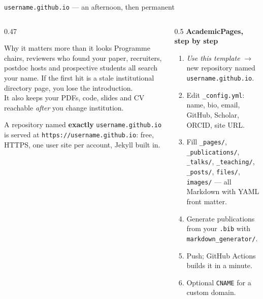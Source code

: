 \documentclass[aspectratio=169,11pt]{beamer}
\newcommand{\code}[1]{\texttt{\small #1}}
\newcommand{\key}[1]{\textbf{\color{brand}#1}}
\begin{document}
\begin{frame}{\code{username.github.io} --- an afternoon, then permanent}
\begin{columns}[T]
\begin{column}{0.47\textwidth}
\begin{block}{Why it matters more than it looks}
\footnotesize
Programme chairs, reviewers who found your paper, recruiters, postdoc hosts
and prospective students all search your name. If the first hit is a stale
institutional directory page, you lose the introduction.\\[3pt]
It also keeps your PDFs, code, slides and CV reachable \emph{after} you change
institution.
\end{block}
\footnotesize
A repository named \key{exactly} \code{username.github.io} is served at
\code{https://username.github.io}: free, HTTPS, one user site per account,
Jekyll built in.
\end{column}
\begin{column}{0.5\textwidth}
\textbf{AcademicPages, step by step}
\footnotesize
\begin{enumerate}
  \item \emph{Use this template} $\rightarrow$ new repository named
        \code{username.github.io}.
  \item Edit \code{\_config.yml}: name, bio, email, GitHub, Scholar, ORCID,
        site URL.
  \item Fill \code{\_pages/}, \code{\_publications/}, \code{\_talks/},
        \code{\_teaching/}, \code{\_posts/}, \code{files/}, \code{images/} ---
        all Markdown with YAML front matter.
  \item Generate publications from your \code{.bib} with
        \code{markdown\_generator/}.
  \item Push; GitHub Actions builds it in a minute.
  \item Optional \code{CNAME} for a custom domain.
\end{enumerate}
\end{column}
\end{columns}
\end{frame}
\end{document}
